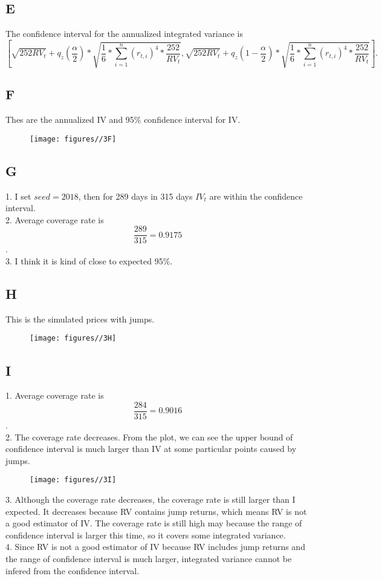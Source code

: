 \documentclass{report}
\begin{document}
\subsection{E}

The confidence interval for the annualized integrated variance is 
\[ [ \sqrt{252RV_{t}} + q_{z}(\frac{\alpha}{2})*\sqrt{\frac{1}{6}*\sum_{i=1}^{n}(r_{t,i})^4*\frac{252}{RV_{t}}} , \sqrt{252RV_{t}} + q_{z}(1-\frac{\alpha}{2})*\sqrt{\frac{1}{6}*\sum_{i=1}^{n}(r_{t,i})^4*\frac{252}{RV_{t}}} ].  \]

\subsection{F}
Thes are the annualized IV and 95\% confidence interval for IV.
\begin{figure}[H]
        \centering 
         \texttt{[image: figures//3F]}
\end{figure}

\subsection{G}

1. I set $ seed = 2018$, then for 289 days in 315 days $ IV_{t}$ are within the confidence interval.\\
2. Average coverage rate is \[ \frac{289}{315} = 0.9175 \].\\
3. I think it is kind of close to expected 95\%.

\subsection{H}
This is the simulated prices with jumps.
\begin{figure}[H]
        \centering 
         \texttt{[image: figures//3H]}
\end{figure}

\subsection{I}

1. Average coverage rate is \[ \frac{284}{315} = 0.9016 \].\\
2. The coverage rate decreases. From the plot, we can see the upper bound of confidence interval is much larger than IV at some particular points caused by jumps. 
\begin{figure}[H]
        \centering 
         \texttt{[image: figures//3I]}
\end{figure}
3. Although the coverage rate decreases, the coverage rate is still larger than I expected. It decreases because RV contains jump returns, which means RV is not a good estimator of IV. The coverage rate is still high may because the range of confidence interval is larger this time, so it covers some integrated variance.\\
4. Since RV is not a good estimator of IV because RV includes jump returns and the range of confidence interval is much larger, integrated variance cannot be infered from the confidence interval.
\end{document}
